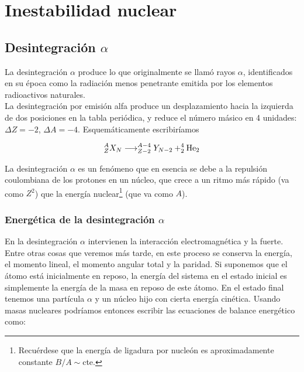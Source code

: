 \chapter{Inestabilidad nuclear}

\section{Desintegración $\alpha$}

La desintegración $\alpha$ produce lo que originalmente se llamó rayos $\alpha$, identificados en su época como la radiación menos penetrante emitida por los elementos radioactivos naturales. \\ %

La desintegración por emisión alfa produce un desplazamiento hacia la izquierda de dos posiciones en la tabla periódica, y reduce el número másico en 4 unidades: $\Delta Z = -2$, $\Delta A = - 4$. Esquemáticamente escribiríamos

\begin{equation}
    ^A_Z  X_N \longrightarrow ^{A-4}_{Z-2} Y_{N-2} + ^4_2\text{He}_2
\end{equation}


La desintegración $\alpha$ es un fenómeno que en esencia se debe a la repulsión coulombiana de los protones en un núcleo, que crece a un ritmo más rápido (va como $Z^2$) que la energía nuclear\footnote{Recuérdese que la energía de ligadura por nucleón es aproximadamente constante $B/A \sim $cte.} (que va como $A$).  %

\subsection{Energética de la desintegración $\alpha$}

En la desintegración $\alpha$ intervienen la interacción electromagnética y la fuerte.  Entre otras cosas que veremos más tarde, en este proceso se conserva la energía, el momento lineal, el momento angular total y la paridad. Si suponemos que el átomo está inicialmente en reposo, la energía del sistema en el estado inicial es simplemente la energía de la masa en reposo de este átomo. En el estado final tenemos una partícula $\alpha$ y un núcleo hijo con cierta energía cinética. Usando masas nucleares podríamos entonces escribir las ecuaciones de balance energético como:

